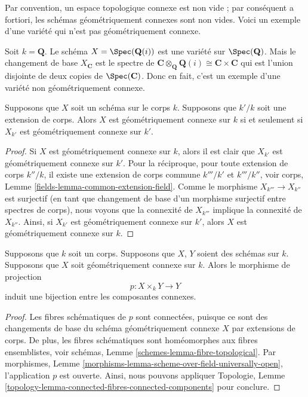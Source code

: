 \noindent
Par convention, un espace topologique connexe est non vide ; par
conséquent a fortiori, les schémas géométriquement connexes sont non
vides. Voici un exemple d'une variété qui n'est pas géométriquement connexe.

\begin{example}
\label{example-not-geometrically-irreducible}
Soit $k = \mathbf{Q}$. Le schéma $X =
\Spec(\mathbf{Q}(i))$ est une variété sur
$\Spec(\mathbf{Q})$. Mais le changement de base
$X_{\mathbf{C}}$ est le spectre de $\mathbf{C}
\otimes_{\mathbf{Q}} \mathbf{Q}(i) \cong \mathbf{C} \times \mathbf{C}$
qui est l'union disjointe de deux copies de $\Spec(\mathbf{C})$. Donc
en fait, c'est un exemple d'une variété non géométriquement connexe.
\end{example}

\begin{lemma}
\label{lemma-geometrically-connected-check-after-extension}
Supposons que $X$ soit un schéma sur le corps $k$.
Supposons que $k'/k$ soit une extension de corps.
Alors $X$ est géométriquement connexe sur $k$ si et
seulement si $X_{k'}$ est géométriquement connexe sur $k'$.
\end{lemma}

\begin{proof}
Si $X$ est géométriquement connexe sur $k$, alors il est clair
que $X_{k'}$ est géométriquement connexe sur $k'$. Pour la
réciproque, pour toute extension de corps $k''/k$, il existe
une extension de corps commune $k'''/k'$ et $k'''/k''$, voir
corps, Lemme \ref{fields-lemma-common-extension-field}. Comme
le morphisme $X_{k'''} \to X_{k''}$ est surjectif (en tant que
changement de base d'un morphisme surjectif entre spectres de
corps), nous voyons que la connexité de $X_{k'''}$ implique la
connexité de $X_{k''}$. Ainsi, si $X_{k'}$ est géométriquement
connexe sur $k'$, alors $X$ est géométriquement connexe sur $k$.
\end{proof}

\begin{lemma}
\label{lemma-bijection-connected-components}
Supposons que $k$ soit un corps. Supposons
que $X$, $Y$ soient des schémas sur $k$.
Supposons que $X$ soit géométriquement
connexe sur $k$. Alors le morphisme de projection
$$
p : X \times_k Y \longrightarrow Y
$$
induit une bijection entre les composantes connexes.
\end{lemma}

\begin{proof}
Les fibres schématiques de $p$ sont connectées,
puisque ce sont des changements de base du
schéma géométriquement connexe $X$ par
extensions de corps. De plus, les fibres
schématiques sont homéomorphes aux fibres
ensemblistes, voir schémas, Lemme
\ref{schemes-lemma-fibre-topological}. Par morphismes,
Lemme
\ref{morphisms-lemma-scheme-over-field-universally-open},
l'application $p$ est ouverte. Ainsi, nous pouvons appliquer Topologie,
Lemme \ref{topology-lemma-connected-fibres-connected-components} pour conclure.
\end{proof}

